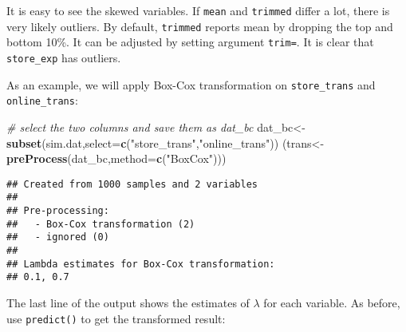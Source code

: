 \documentclass[
]{article}
\newenvironment{Shaded}{\begin{snugshade}}{\end{snugshade}}
\newcommand{\CommentTok}[1]{\textcolor[rgb]{0.56,0.35,0.01}{\textit{#1}}}
\newcommand{\DataTypeTok}[1]{\textcolor[rgb]{0.13,0.29,0.53}{#1}}
\newcommand{\DecValTok}[1]{\textcolor[rgb]{0.00,0.00,0.81}{#1}}
\newcommand{\KeywordTok}[1]{\textcolor[rgb]{0.13,0.29,0.53}{\textbf{#1}}}
\newcommand{\NormalTok}[1]{#1}
\newcommand{\OperatorTok}[1]{\textcolor[rgb]{0.81,0.36,0.00}{\textbf{#1}}}
\newcommand{\StringTok}[1]{\textcolor[rgb]{0.31,0.60,0.02}{#1}}
\begin{document}
It is easy to see the skewed variables. If \texttt{mean} and
\texttt{trimmed} differ a lot, there is very likely outliers. By
default, \texttt{trimmed} reports mean by dropping the top and bottom
10\%. It can be adjusted by setting argument \texttt{trim=}. It is clear
that \texttt{store\_exp} has outliers.

As an example, we will apply Box-Cox transformation on
\texttt{store\_trans} and \texttt{online\_trans}:

\begin{Shaded}
\begin{Highlighting}[]
\CommentTok{# select the two columns and save them as dat_bc}
\NormalTok{dat_bc<-}\KeywordTok{subset}\NormalTok{(sim.dat,}\DataTypeTok{select=}\KeywordTok{c}\NormalTok{(}\StringTok{"store_trans"}\NormalTok{,}\StringTok{"online_trans"}\NormalTok{))}
\NormalTok{(trans<-}\KeywordTok{preProcess}\NormalTok{(dat_bc,}\DataTypeTok{method=}\KeywordTok{c}\NormalTok{(}\StringTok{"BoxCox"}\NormalTok{)))}
\end{Highlighting}
\end{Shaded}

\begin{verbatim}
## Created from 1000 samples and 2 variables
## 
## Pre-processing:
##   - Box-Cox transformation (2)
##   - ignored (0)
## 
## Lambda estimates for Box-Cox transformation:
## 0.1, 0.7
\end{verbatim}

The last line of the output shows the estimates of \(\lambda\) for each
variable. As before, use \texttt{predict()} to get the transformed
result:

\begin{Shaded}
\end{Shaded}
\end{document}
